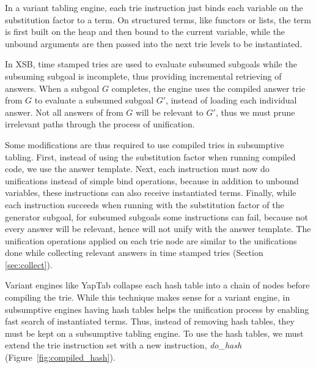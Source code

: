 In a variant tabling engine, each trie instruction just binds each variable on the substitution factor to a term.
On structured terms, like functors or lists, the term is first built on the heap and then
bound to the current variable, while the unbound arguments are then passed into the next trie levels
to be instantiated.

In XSB, time stamped tries are used to evaluate subsumed subgoals while the subsuming subgoal
is incomplete, thus providing incremental retrieving of answers.
When a subgoal $G$ completes, the engine uses the compiled answer trie from $G$
to evaluate a subsumed subgoal $G'$, instead of loading each individual answer.
Not all answers of from $G$ will be relevant to $G'$, thus we must prune irrelevant paths
through the process of unification. 

Some modifications are thus required to use compiled tries in subsumptive tabling. First,
instead of using the substitution factor when running compiled code, we use the answer template.
Next, each instruction must now do unifications instead of simple bind operations,
because in addition to unbound variables, these instructions can also receive instantiated terms.
Finally, while each instruction succeeds when running with the substitution factor of the generator
subgoal, for subsumed subgoals some instructions can fail, because not every answer will be relevant,
hence will not unify with the answer template. The unification operations applied on each trie node
are similar to the unifications done while collecting relevant answers in time stamped tries
(Section \ref{sec:collect}).

Variant engines like YapTab collapse each hash table into a chain of nodes before compiling
the trie. While this technique makes sense for a variant engine, in subsumptive engines
having hash tables helps the unification process by enabling fast search of instantiated terms.
Thus, instead of removing hash tables, they must be kept on a subsumptive tabling engine.
To use the hash tables, we must extend the trie instruction set with a new instruction,
\textit{do\_hash} (Figure~\ref{fig:compiled_hash}).

